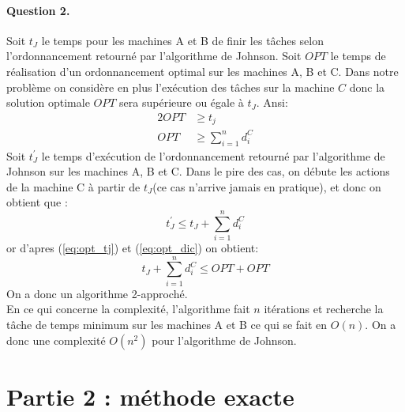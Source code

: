 \documentclass[a4paper, 10pt]{article}
\begin{document}
	\paragraph{Question 2.}{Soit $t_J$ le temps pour les machines A et B de finir les tâches selon l'ordonnancement retourné par l'algorithme de Johnson. Soit $OPT$ le temps de réalisation d'un ordonnancement optimal sur les machines A, B et C.
          Dans notre problème on considère en plus l'exécution des tâches sur la machine $C$ donc la solution optimale $OPT$ sera supérieure ou égale à $t_J$. Ansi:
          \begin{alignat}{2}
          	\label{eq:opt_tj}
          	OPT &\geq t_j \\
          	\label{eq:opt_dic}
          	OPT &\geq \sum_{i=1}^n d_i^C
          \end{alignat}
          Soit $t^\prime_J$ le temps d'exécution de l'ordonnancement retourné par l'algorithme de Johnson sur les machines A, B et C. Dans le pire des cas, on débute les actions de la machine C à partir de $t_J$(ce cas n'arrive jamais en pratique), et donc on obtient que :
          \begin{equation*}
	          t^\prime_J \le t_J + \sum_{i=1}^n d_i^C
	      \end{equation*}
	      or d'apres (\ref{eq:opt_tj}) et (\ref{eq:opt_dic}) on obtient:
		\begin{equation*}
			t_J + \sum_{i=1}^n d_i^C \le OPT + OPT
		\end{equation*}
		On a donc un algorithme 2-approché.\\[0.35cm]
		En ce qui concerne la complexité, l'algorithme fait $n$ itérations et recherche la tâche de temps minimum sur les machines A et B ce qui se fait en $O(n)$. On a donc une complexité $O(n^2)$ pour l'algorithme de Johnson.
		}
		
	\section*{Partie 2 : méthode exacte}
		
\end{document}
